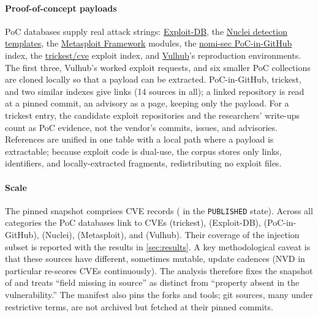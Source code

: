 \paragraph{Proof-of-concept payloads}
PoC databases supply real attack strings:
\href{https://gitlab.com/exploit-database/exploitdb}{Exploit-DB}, the
\href{https://github.com/projectdiscovery/nuclei-templates}{Nuclei detection
templates}, the
\href{https://github.com/rapid7/metasploit-framework}{Metasploit Framework}
modules, the
\href{https://github.com/nomi-sec/PoC-in-GitHub}{nomi-sec PoC-in-GitHub} index,
the \href{https://github.com/trickest/cve}{trickest/cve} exploit index, and
\href{https://github.com/vulhub/vulhub}{Vulhub}'s reproduction environments.
The first three, Vulhub's worked exploit requests, and six smaller PoC
collections are cloned locally so that a payload can be extracted.
PoC-in-GitHub, trickest, and two similar indexes give links (14 sources in all); a
linked repository is read at a pinned commit, an advisory as a page, keeping only the payload.
For a trickest entry, the candidate exploit repositories and the
researchers' write-ups count as PoC evidence, not the vendor's commits, issues,
and advisories.
References are unified in one table with a local path where a payload is
extractable; because exploit code is dual-use, the corpus stores only links,
identifiers, and locally-extracted fragments, redistributing no exploit files.

\paragraph{Scale}
The pinned snapshot comprises \textbf{\dataCVERecords} CVE records
(\textbf{\dataPublishedCVEs} in the \texttt{PUBLISHED} state).
Across all categories the PoC databases link to \dataPocTrickestCVEs CVEs (trickest),
\dataPocExploitdbCVEs (Exploit-DB), \dataPocGithubCVEs (PoC-in-GitHub), \dataPocNucleiCVEs (Nuclei),
\dataPocMetasploitCVEs (Metasploit), and \dataPocVulhubCVEs (Vulhub). Their
coverage of the injection subset is reported with the results in
\cref{sec:results}.
A key methodological caveat is that these sources have different, sometimes
mutable, update cadences (NVD in particular re-scores CVEs continuously).
The analysis therefore fixes the snapshot of \dataSnapshotDate{} and treats ``field missing in
source'' as distinct from ``property absent in the vulnerability.''
The manifest also pins the forks and tools; git sources, many under restrictive
terms, are not archived but fetched at their pinned commits.
